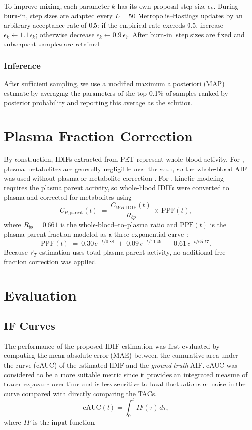 To improve mixing, each parameter \(k\) has its own proposal step size \(\epsilon_k\).
During burn-in, step sizes are adapted every \(L=50\) Metropolis–Hastings updates by an arbitrary acceptance rate of 0.5: if the empirical rate exceeds 0.5, increase \(\epsilon_k \leftarrow 1.1\,\epsilon_k\); otherwise decrease \(\epsilon_k \leftarrow 0.9\,\epsilon_k\).
After burn-in, step sizes are fixed and subsequent samples are retained.

\subsubsection{Inference}
After sufficient sampling, we use a modified maximum a posteriori (MAP) estimate by averaging the parameters of the top 0.1\% of samples ranked by posterior probability and reporting this average as the solution.
\section{Plasma Fraction Correction}
By construction, IDIFs extracted from PET represent whole-blood activity.
For \fdg, plasma metabolites are generally negligible over the scan, so the whole-blood AIF was used without plasma or metabolite correction \cite{gambhir1989simple}.
For \yohimbine, kinetic modeling requires the plasma parent activity, so whole-blood IDIFs were converted to plasma and corrected for metabolites using
\begin{equation}
	C_{P,\mathrm{parent}}(t) \;=\; \frac{C_{WB,\mathrm{IDIF}}(t)}{R_{bp}} \,\times\, \mathrm{PPF}(t),
\end{equation}
where \(R_{bp}=0.661\) is the whole-blood–to–plasma ratio and \(\mathrm{PPF}(t)\) is the plasma parent fraction modeled as a three-exponential curve \cite{laurencin2021modeling}: %
\begin{equation}
	\mathrm{PPF}(t) \;=\; 0.30\,e^{-t/0.88} \;+\; 0.09\,e^{-t/11.49} \;+\; 0.61\,e^{-t/65.77}.
\end{equation}
Because \(V_T\) estimation uses total plasma parent activity, no additional free-fraction correction was applied.

\section{Evaluation}

\subsection{IF Curves}
The performance of the proposed IDIF estimation was first evaluated by computing the mean absolute error (MAE) between the cumulative area under the curve (cAUC) of the estimated IDIF and the \textit{ground truth} AIF. %
cAUC was considered to be a more suitable metric since it provides an integrated measure of tracer exposure over time and is less sensitive to local fluctuations or noise in the curve compared with directly comparing the TACs. %
\begin{equation}
	\textrm{cAUC}(t) =  \int_{0}^{t} IF(\tau) \, d\tau,
\end{equation}
where \(IF\) is the input function.

